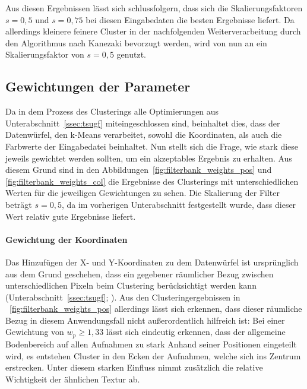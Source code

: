 Aus diesen Ergebnissen lässt sich schlussfolgern, dass sich die Skalierungsfaktoren $s=0,5$ und $s=0,75$ bei diesen Eingabedaten die besten Ergebnisse liefert. Da allerdings kleinere \bzw feinere Cluster in der nachfolgenden Weiterverarbeitung durch den Algorithmus nach Kanezaki bevorzugt werden, wird von nun an ein Skalierungsfaktor von $s=0,5$ genutzt.

\subsection{Gewichtungen der Parameter}
\label{ssec:filterweight}

Da in dem Prozess des Clusterings alle Optimierungen aus Unterabschnitt~\ref{ssec:tsugf} miteingeschlossen sind, beinhaltet dies, dass der Datenwürfel, den k-Means verarbeitet, sowohl die Koordinaten, als auch die Farbwerte der Eingabedatei beinhaltet. Nun stellt sich die Frage, wie stark diese jeweils gewichtet werden sollten, um ein akzeptables Ergebnis zu erhalten. Aus diesem Grund sind in den Abbildungen~\ref{fig:filterbank_weights_pos} und \ref{fig:filterbank_weights_col} die Ergebnisse des Clusterings mit unterschiedlichen Werten für die jeweiligen Gewichtungen zu sehen. Die Skalierung der Filter beträgt $s=0,5$, da im vorherigen Unterabschnitt festgestellt wurde, dass dieser Wert relativ gute Ergebnisse liefert.

\paragraph{Gewichtung der Koordinaten}
Das Hinzufügen der X- und Y-Koordinaten zu dem Datenwürfel ist ursprünglich aus dem Grund geschehen, dass ein gegebener räumlicher Bezug zwischen unterschiedlichen Pixeln beim Clustering berücksichtigt werden kann (\vgl Unterabschnitt~\ref{ssec:tsugf}; \cite{jain_91}). Aus den Clusteringergebnissen in \figurename~\ref{fig:filterbank_weights_pos} allerdings lässt sich erkennen, dass dieser räumliche Bezug in diesem Anwendungsfall nicht außerordentlich hilfreich ist: Bei einer Gewichtung von $w_p\geq1,33$ lässt sich eindeutig erkennen, dass der allgemeine Bodenbereich auf allen Aufnahmen zu stark Anhand seiner Positionen eingeteilt wird, es entstehen Cluster in den Ecken der Aufnahmen, welche sich ins Zentrum erstrecken. Unter diesem starken Einfluss nimmt zusätzlich die relative Wichtigkeit der ähnlichen Textur ab.

